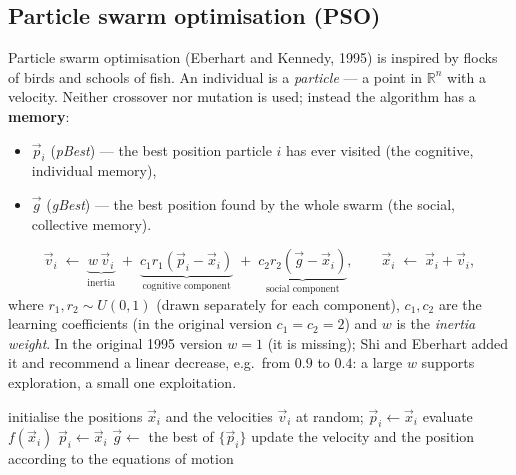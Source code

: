 \documentclass[11pt,a4paper]{article}
\theoremstyle{definition}
\begin{document}
\subsection{Particle swarm optimisation (PSO)}

Particle swarm optimisation (Eberhart and Kennedy, 1995) is inspired by flocks
of birds and schools of fish. An individual is a \emph{particle} --- a point in
$\mathbb{R}^n$ with a velocity. Neither crossover nor mutation is used; instead
the algorithm has a \textbf{memory}:
\begin{itemize}
\item $\vec p_i$ (\emph{pBest}) --- the best position particle $i$ has ever
  visited (the cognitive, individual memory),
\item $\vec g$ (\emph{gBest}) --- the best position found by the whole swarm
  (the social, collective memory).
\end{itemize}

\begin{defbox}
\[
\vec v_i \;\gets\; \underbrace{w\,\vec v_i}_{\text{inertia}}
\;+\; \underbrace{c_1 r_1 (\vec p_i - \vec x_i)}_{\text{cognitive component}}
\;+\; \underbrace{c_2 r_2 (\vec g - \vec x_i)}_{\text{social component}},
\qquad
\vec x_i \;\gets\; \vec x_i + \vec v_i ,
\]
where $r_1, r_2 \sim U(0,1)$ (drawn separately for each component),
$c_1, c_2$ are the learning coefficients (in the original version
$c_1 = c_2 = 2$) and $w$ is the \emph{inertia weight}.
In the original 1995 version $w = 1$ (it is missing); Shi and Eberhart added it
and recommend a linear decrease, e.g.\ from $0.9$ to $0.4$: a large $w$ supports
exploration, a small one exploitation.
\end{defbox}

\begin{algorithm}[!ht]
\caption{PSO}
\begin{algorithmic}[1]
\State initialise the positions $\vec x_i$ and the velocities $\vec v_i$ at random; $\vec p_i \gets \vec x_i$
\Repeat
    \State evaluate $f(\vec x_i)$
     $\vec p_i \gets \vec x_i$ \EndIf
  \EndFor
  \State $\vec g \gets$ the best of $\{\vec p_i\}$
    \State update the velocity and the position according to the equations of motion
  \EndFor
{}
\end{algorithmic}
\end{algorithm}
\end{document}
